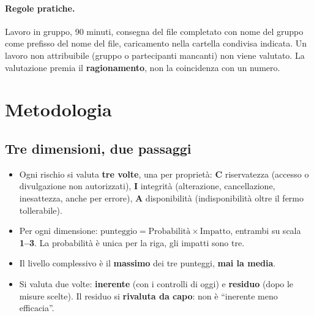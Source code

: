 \paragraph{Regole pratiche.} Lavoro in gruppo, 90 minuti, consegna del file completato con nome del
gruppo come prefisso del nome del file, caricamento nella cartella condivisa indicata. Un lavoro non
attribuibile (gruppo o partecipanti mancanti) non viene valutato. La valutazione premia il
\textbf{ragionamento}, non la coincidenza con un numero.

\section{Metodologia}

\subsection{Tre dimensioni, due passaggi}
\begin{itemize}
  \item Ogni rischio si valuta \textbf{tre volte}, una per proprietà: \textbf{C} riservatezza (accesso o
    divulgazione non autorizzati), \textbf{I} integrità (alterazione, cancellazione, inesattezza, anche
    per errore), \textbf{A} disponibilità (indisponibilità oltre il fermo tollerabile).
  \item Per ogni dimensione: $\text{punteggio} = \text{Probabilità} \times \text{Impatto}$, entrambi su
    scala \textbf{1--3}. La probabilità è unica per la riga, gli impatti sono tre.
  \item Il livello complessivo è il \textbf{massimo} dei tre punteggi, \textbf{mai la media}.
  \item Si valuta due volte: \textbf{inerente} (con i controlli di oggi) e \textbf{residuo} (dopo le
    misure scelte). Il residuo si \textbf{rivaluta da capo}: non è ``inerente meno efficacia''.
\end{itemize}

